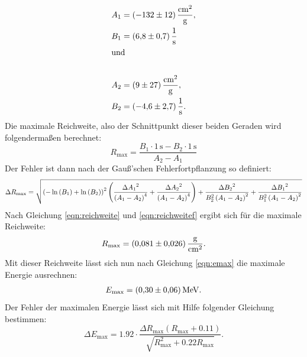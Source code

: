 \begin{align*}
A_1 &= (\num{-132 +- 12})\,\frac{\si{\centi\meter\squared}}{\si{\gram}} ,\\
B_1 &= (\num{6.8 +- 0.7})\,\frac{1}{\si{\second}} \\
\intertext{und} \\
A_2 &= (\num{9 +- 27})\,\frac{\si{\centi\meter\squared}}{\si{\gram}} ,\\
B_2 &= (\num{-4.6 +- 2.7})\,\frac{1}{\si{\second}}.
\end{align*}
Die maximale Reichweite, also der Schnittpunkt dieser beiden Geraden wird folgendermaßen berechnet:
\begin{equation}
  \label{eqn:reichweite}
R_\text{max} = \frac{B_1 \cdot 1\,\si{\second} - B_2 \cdot 1\,\si{\second}}{A_2 - A_1}
\end{equation}
Der Fehler ist dann nach der Gauß'schen Fehlerfortpflanzung so definiert:
\begin{equation}
  \tiny
\label{eqn:reichweitef}
\Delta R_\text{max} = \sqrt{\left(- \ln{\left (B_{1} \right )} +
\ln{\left (B_{2} \right )}\right)^{2} \left( \frac{\Delta{A_{1}}^{2}}{\left(A_{1} - A_{2}\right)^{4}} + \frac{\Delta{A_{2}}^{2}}{\left(A_{1} - A_{2}\right)^{4}} \right)
 + \frac{\Delta{B_{2}}^{2}}{B_{2}^{2}
\left(A_{1} - A_{2}\right)^{2}} + \frac{\Delta{B_{1}}^{2}}{B_{1}^{2} \left(A_{1} - A_{2}\right)^{2}}}
\end{equation}
Nach Gleichung \eqref{eqn:reichweite} und \eqref{eqn:reichweitef} ergibt sich für die maximale Reichweite:
\begin{align*}
R_\text{max} = (\num{0.081 +- 0.026})\,\frac{\si{\gram}}{\si{\centi\meter\squared}}.
\end{align*}
Mit dieser Reichweite lässt sich nun nach Gleichung \eqref{eqn:emax} die maximale Energie ausrechnen:
\begin{align*}
E_\text{max} = (\num{0.30 +- 0.06})\,\si{\mega\electronvolt}.
\end{align*}
Der Fehler der maximalen Energie lässt sich mit Hilfe folgender Gleichung bestimmen:
\begin{equation}
\Delta E_\text{max} = 1.92 \cdot \frac{\Delta R_\text{max} \left(R_\text{max} + 0.11\right)}{\sqrt{R_\text{max}^{2} + 0.22 R_\text{max}}}.
\end{equation}
